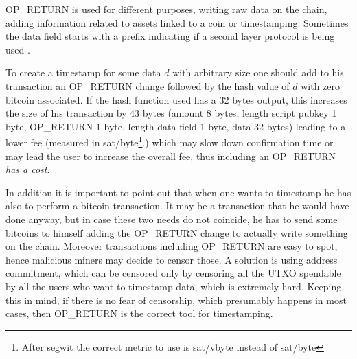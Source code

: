 OP\_RETURN is used for different purposes, writing raw data on the chain, adding information related to assets linked to a coin or timestamping. Sometimes the data field starts with a prefix indicating if a second layer protocol is being used \cite{DBLP:conf/fc/BartolettiP17}. 

To create a timestamp for some data $d$ with arbitrary size one should add to his transaction an OP\_RETURN change followed by the hash value of $d$ with zero bitcoin associated. If the hash function used has a 32 bytes output, this increases the size of his transaction by 43 bytes (amount 8 bytes, length script pubkey 1 byte, OP\_RETURN 1 byte, length data field 1 byte, data 32 bytes) leading to a lower fee (measured in sat/byte\footnote{After segwit the correct metric to use is sat/vbyte instead of sat/byte}.) which may slow down confirmation time or may lead the user to increase the overall fee, thus including an OP\_RETURN \textit{has a cost}.

In addition it is important to point out that when one wants to timestamp he has also to perform a bitcoin transaction. It may be a transaction that he would have done anyway, but in case these two needs do not coincide, he has to send some bitcoins to himself adding the OP\_RETURN change to actually write something on the chain.
Moreover transactions including OP\_RETURN are easy to spot, hence malicious miners may decide to censor those. A solution is using address commitment, which can be censored only by censoring all the UTXO spendable by all the users who want to timestamp data, which is extremely hard.
Keeping this in mind, if there is no fear of censorship, which presumably happens in most cases, then OP\_RETURN is the correct tool for timestamping.
